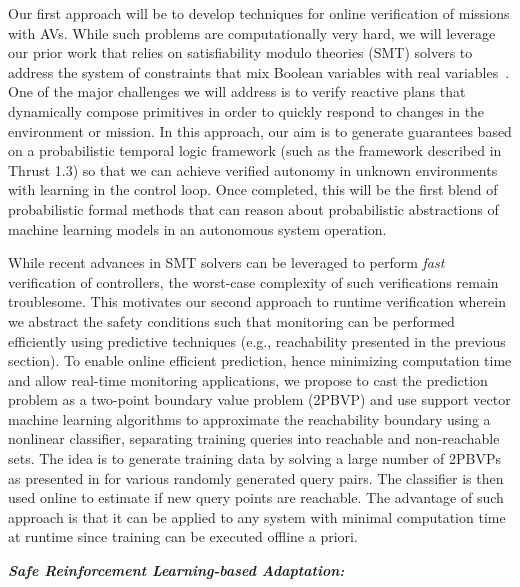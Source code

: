  Our first approach will be to develop techniques for online verification of missions with AVs. While such problems are computationally very hard, we will leverage our prior work that relies on satisfiability modulo theories (SMT) solvers to address the system of constraints that mix Boolean variables with real variables~\cite{saha2014automated}. One of the major challenges we will address is to verify reactive plans that dynamically compose primitives in order to quickly respond to changes in the environment or mission.  In this approach, our aim is to generate guarantees based on a probabilistic temporal logic framework (such as the framework described in Thrust 1.3) so that we can achieve verified autonomy in unknown environments with learning in the control loop.  Once completed, this will be the first blend of probabilistic formal methods that can reason about probabilistic abstractions of machine learning models in an autonomous system operation.  

While recent advances in SMT solvers can be leveraged to perform \emph{fast} verification of controllers, the worst-case complexity of such verifications remain troublesome.  This motivates our second approach to runtime verification wherein we abstract the safety conditions such that monitoring can be performed efficiently using predictive techniques (e.g., reachability presented in the previous section). To enable online efficient prediction, hence minimizing computation time and allow real-time monitoring applications, we propose to cast the prediction problem as a two-point boundary value problem (2PBVP) \cite{allen2014machine} and use support vector machine learning algorithms to approximate the reachability boundary using a nonlinear classifier, separating training queries into reachable and non-reachable sets. The idea is to generate training data by solving a large number of 2PBVPs as presented in \cite{allen2014machine} for various randomly generated query pairs. The classifier is then used online to estimate if new query points are reachable. The advantage of such approach is that it can be applied to any system with minimal computation time at runtime since training can be executed offline a priori. 




\noindent\textbf{\em Safe Reinforcement Learning-based Adaptation:} 

